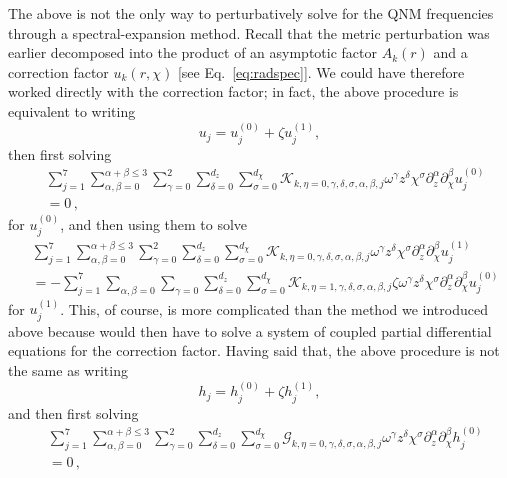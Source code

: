 \documentclass[aps,prx,amsmath,floats,floatfix,twocolumn,
  superscriptaddress,nofootinbib,showpacs]{revtex4-1}
\begin{document}
The above is not the only way to perturbatively solve for the QNM frequencies through a spectral-expansion method. Recall that the metric perturbation was earlier decomposed into the product of an asymptotic factor $A_k(r)$ and a correction factor $u_k(r,\chi)$ [see Eq.~\eqref{eq:radspec}]. We could have therefore worked directly with the correction factor; in fact, the above procedure is equivalent to writing 
\begin{equation}
u_j = u^{(0)}_j + \zeta u^{(1)}_j, 
\end{equation}
then first solving 
\begin{equation}
\begin{split}
& \sum_{j=1}^{7} \sum_{\alpha, \beta = 0}^{\alpha+\beta \leq 3} \sum_{\gamma=0}^{2} \sum_{\delta=0}^{d_{z}} \sum_{\sigma=0}^{d_{\chi}} \mathcal{K}_{k, \eta = 0, \gamma, \delta, \sigma, \alpha, \beta, j} \omega^\gamma z^{\delta} \chi^{\sigma} \partial_{z}^{\alpha} \partial_{\chi}^{\beta} u^{(0)}_j \\
& = 0 \,, 
\end{split}
\end{equation}
for $u^{(0)}_j$, and then using them to solve 
\begin{equation}
\begin{split}
& \sum_{j=1}^{7} \sum_{\alpha, \beta = 0}^{\alpha+\beta \leq 3} \sum_{\gamma=0}^{2} \sum_{\delta=0}^{d_{z}} \sum_{\sigma=0}^{d_{\chi}} \mathcal{K}_{k, \eta = 0, \gamma, \delta, \sigma, \alpha, \beta, j} \omega^\gamma z^{\delta} \chi^{\sigma} \partial_{z}^{\alpha} \partial_{\chi}^{\beta} u^{(1)}_j \\
& = - \sum_{j=1}^{7} \sum_{\alpha, \beta = 0} \sum_{\gamma=0} \sum_{\delta=0}^{d_{z}} \sum_{\sigma=0}^{d_{\chi}} \mathcal{K}_{k, \eta = 1, \gamma, \delta, \sigma, \alpha, \beta, j} \zeta \omega^\gamma z^{\delta} \chi^{\sigma} \partial_{z}^{\alpha} \partial_{\chi}^{\beta} u_j^{(0)} 
\end{split}
\end{equation}
for $u^{(1)}_j$. This, of course, is more complicated than the method we introduced above because would then have to solve a system of coupled partial differential equations for the correction factor. 
Having said that, the above procedure is not the same as writing 
\begin{equation}
h_j = h^{(0)}_j + \zeta h^{(1)}_j, 
\end{equation}
and then first solving 
\begin{equation}
\begin{split}
& \sum_{j=1}^{7} \sum_{\alpha, \beta = 0}^{\alpha+\beta \leq 3} \sum_{\gamma=0}^{2} \sum_{\delta=0}^{d_{z}} \sum_{\sigma=0}^{d_{\chi}} \mathcal{G}_{k, \eta = 0, \gamma, \delta, \sigma, \alpha, \beta, j} \omega^\gamma z^{\delta} \chi^{\sigma} \partial_{z}^{\alpha} \partial_{\chi}^{\beta} h^{(0)}_j \\
& = 0 \,, 
\end{split}
\end{equation}
\end{document}
